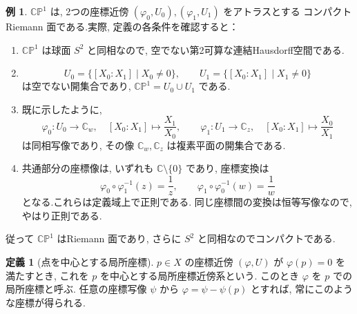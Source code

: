 \documentclass[dvipdfmx,a4paper,11pt]{article} %
\newcommand{\C}{\mathbb{C}}
\theoremstyle{definition}
\numberwithin{equation}{section}
\newtheorem{dfn}[thm]{定義}
\newtheorem{exa}[thm]{例}
\begin{document}
\begin{exa}
$\C\mathbb P^1$ は, 2つの座標近傍
$(\varphi_0,U_0),(\varphi_1,U_1)$ をアトラスとする
コンパクトRiemann 面である.実際, 定義の各条件を確認すると：
\begin{enumerate}
\item $\C\mathbb P^1$ は球面 $S^2$ と同相なので, 
空でない第2可算な連結Hausdorff空間である.

\item
\[
U_0=\{[X_0:X_1]\mid X_0\neq0\},\qquad
U_1=\{[X_0:X_1]\mid X_1\neq0\}
\]
は空でない開集合であり, $\C\mathbb P^1=U_0\cup U_1$ である.

\item 既に示したように, 
\[
\varphi_0:U_0\to\C_w,\quad [X_0:X_1]\mapsto\frac{X_1}{X_0},
\qquad
\varphi_1:U_1\to\C_z,\quad [X_0:X_1]\mapsto\frac{X_0}{X_1}
\]
は同相写像であり, その像 $\C_w,\C_z$ は複素平面の開集合である.

\item 共通部分の座標像は, いずれも $\C\setminus\{0\}$ であり, 
座標変換は
\[
\varphi_0\circ\varphi_1^{-1}(z)=\frac1z,\qquad
\varphi_1\circ\varphi_0^{-1}(w)=\frac1w
\]
となる.これらは定義域上で正則である.
同じ座標間の変換は恒等写像なので, やはり正則である.
\end{enumerate}
従って $\C\mathbb P^1$ はRiemann 面であり, 
さらに $S^2$ と同相なのでコンパクトである.
\end{exa}

\begin{dfn}[点を中心とする局所座標]\label{O-M047}
$p\in X$ の座標近傍 $(\varphi,U)$ が $\varphi(p)=0$ を満たすとき,
これを $p$ を中心とする局所座標近傍系という.
このとき $\varphi$ を $p$ での局所座標と呼ぶ.
任意の座標写像 $\psi$ から $\varphi=\psi-\psi(p)$ とすれば,
常にこのような座標が得られる.
\end{dfn}
\end{document}
